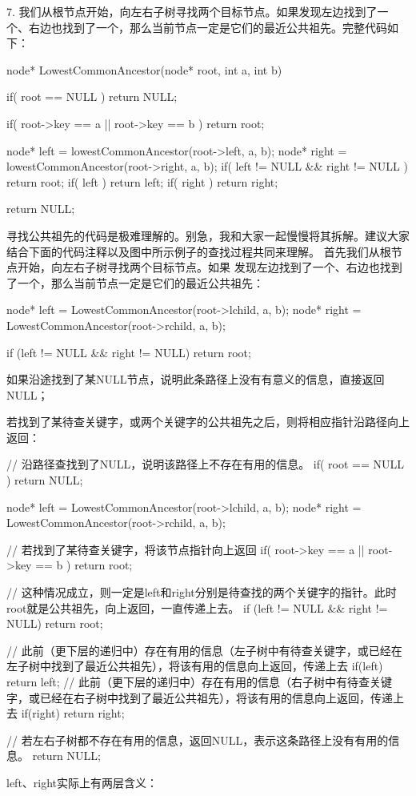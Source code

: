 7. 我们从根节点开始，向左右子树寻找两个目标节点。如果发现左边找到了一个、右边也找到了一个，那么当前节点一定是它们的最近公共祖先。完整代码如下：
\begin{cppcode}
    node* LowestCommonAncestor(node* root, int a, int b) {
        if( root == NULL ) return NULL;

        if( root->key == a || root->key == b ) return root;

        node* left = lowestCommonAncestor(root->left, a, b);
        node* right = lowestCommonAncestor(root->right, a, b);
        if( left != NULL && right != NULL ) return root;
        if( left ) return left;
        if( right ) return right;

        return NULL;

    }
\end{cppcode}
寻找公共祖先的代码是极难理解的。别急，我和大家一起慢慢将其拆解。建议大家结合下面的代码注释以及图中所示例子的查找过程共同来理解。
首先我们从根节点开始，向左右子树寻找两个目标节点。如果
发现左边找到了一个、右边也找到了一个，那么当前节点一定是它们的最近公共祖先：
\begin{cppcode}

    node* left = LowestCommonAncestor(root->lchild, a, b);
    node* right = LowestCommonAncestor(root->rchild, a, b);

    if (left != NULL && right != NULL)
        return root;
\end{cppcode}
如果沿途找到了某NULL节点，说明此条路径上没有有意义的信息，直接返回NULL；

若找到了某待查关键字，或两个关键字的公共祖先之后，则将相应指针沿路径向上返回：
\begin{cppcode}
// 沿路径查找到了NULL，说明该路径上不存在有用的信息。
    if( root == NULL ) return NULL;

    node* left = LowestCommonAncestor(root->lchild, a, b);
    node* right = LowestCommonAncestor(root->rchild, a, b);

// 若找到了某待查关键字，将该节点指针向上返回
    if( root->key == a || root->key == b ) return root;

// 这种情况成立，则一定是left和right分别是待查找的两个关键字的指针。此时root就是公共祖先，向上返回，一直传递上去。
    if (left != NULL && right != NULL)
        return root;

    // 此前（更下层的递归中）存在有用的信息（左子树中有待查关键字，或已经在左子树中找到了最近公共祖先），将该有用的信息向上返回，传递上去
    if(left) return left;
    // 此前（更下层的递归中）存在有用的信息（右子树中有待查关键字，或已经在右子树中找到了最近公共祖先），将该有用的信息向上返回，传递上去
    if(right) return right;

    // 若左右子树都不存在有用的信息，返回NULL，表示这条路径上没有有用的信息。
    return NULL;
\end{cppcode}
left、right实际上有两层含义：

